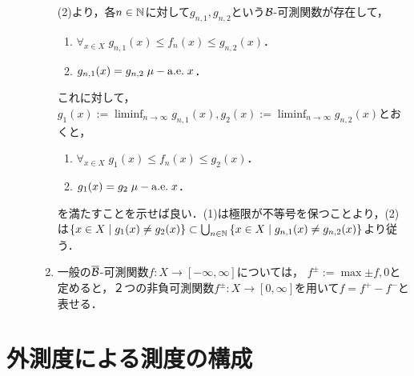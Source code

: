 \documentclass[uplatex, dvipdfmx]{jsreport}
\begin{document}
\begin{Proof}
\begin{description}
\begin{enumerate}
            (2)より，各$n\in\mathbb{N}$に対して$g_{n,1},g_{n,2}$という$\mathcal{B}$-可測関数が存在して，
            \begin{enumerate}
                \item $\forall_{x\in X}\;g_{n,1}(x)\le f_n(x)\le g_{n,2}(x)$．
                \item $g_{n,1}(x)=g_{n,2}\;\mu-\mathrm{a.e.}\; x$．
            \end{enumerate}
            これに対して，$g_1(x):=\liminf_{n\to\infty}g_{n,1}(x),g_2(x):=\liminf_{n\to\infty}g_{n,2}(x)$とおくと，
            \begin{enumerate}
                \item $\forall_{x\in X}\;g_{1}(x)\le f_n(x)\le g_{2}(x)$．
                \item $g_{1}(x)=g_{2}\;\mu-\mathrm{a.e.}\; x$．
            \end{enumerate}
            を満たすことを示せば良い．(1)は極限が不等号を保つことより，(2)は$\{x\in X\mid g_1(x)\ne g_2(x)\}\subset\bigcup_{n\in\mathbb{N}}\left\{x\in X\mid g_{n,1}(x)\ne g_{n,2}(x)\right\}$より従う．
            \item 一般の$\overline{\mathcal{B}}$-可測関数$f:X\to[-\infty,\infty]$については，
            $f^{\pm}:=\max{\pm f,0}$と定めると，２つの非負可測関数$f^\pm:X\to[0,\infty]$を用いて$f=f^+-f^-$と表せる．
        \end{enumerate}
    \end{description}
\end{Proof}


\section{外測度による測度の構成}

    
\end{document}
